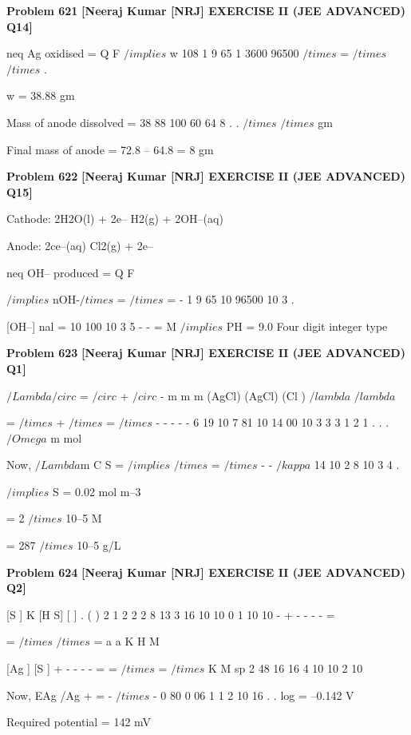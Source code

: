 \begin{problembox}
\textbf{Problem 621} \hfill \textbf{[Neeraj Kumar [NRJ] EXERCISE II (JEE ADVANCED) Q14]}
\label{q:ext-nrj_all_questions-621}

neq Ag oxidised = Q
F $/implies$ w
108
1
9 65 1 3600
96500
$/times$ =
$/times$ $/times$
.
 
   w = 38.88 gm
 
   Mass of anode dissolved = 38 88
100
60
64 8
.
.
$/times$
$/times$
gm
 
   Final mass of anode = 72.8 -- 64.8 = 8 gm
\end{problembox}

\begin{problembox}
\textbf{Problem 622} \hfill \textbf{[Neeraj Kumar [NRJ] EXERCISE II (JEE ADVANCED) Q15]}
\label{q:ext-nrj_all_questions-622}

Cathode: 2H2O(l) + 2e-- 
 H2(g) + 2OH--(aq)
 
 Anode: 2ce--(aq) 
 Cl2(g) + 2e--
 
 neq OH-- produced = Q
F 
 
 $/implies$ nOH-$/times$ =
$/times$
=
-
1
9 65 10
96500
10 3
.
 
   [OH--]  nal = 10
100
10
3
5
-
-
=
M $/implies$ PH = 9.0
Four digit integer type
\end{problembox}

\begin{problembox}
\textbf{Problem 623} \hfill \textbf{[Neeraj Kumar [NRJ] EXERCISE II (JEE ADVANCED) Q1]}
\label{q:ext-nrj_all_questions-623}

$/Lambda$$/circ$
=
$/circ$
+ $/circ$
-
m
m
m
(AgCl)
(AgCl)
(Cl )
$/lambda$
$/lambda$
 
 
                 
=
$/times$
+
$/times$
=
$/times$
-
-
-
-
-
6 19 10
7 81 10
14 00 10
3
3
3
1
2
1
.
.
.
$/Omega$ m mol
 
 
 Now, $/Lambda$m
C
S
=
$/implies$
$/times$
=
$/times$
-
-
$/kappa$
14 10
2 8 10
3
4
.
 
 
 $/implies$ S = 0.02 mol m--3 
 
         = 2 $/times$ 10--5 M
 
         = 287 $/times$ 10--5 g/L
\end{problembox}

\begin{problembox}
\textbf{Problem 624} \hfill \textbf{[Neeraj Kumar [NRJ] EXERCISE II (JEE ADVANCED) Q2]}
\label{q:ext-nrj_all_questions-624}

[S
]
K
[H S]
[
]
.
(
)
2
1
2
2
2
8
13
3
16
10
10
0 1
10
10
-
+
-
-
-
-
=
 
 
=
$/times$
$/times$
=
a
a
K
H
M
 
 
   [Ag ]
[S
]
+
-
-
-
-
=
=
$/times$
=
$/times$
K
M
sp
2
48
16
16
4
10
10
2
10
 
 
 Now, EAg /Ag
+
=
-
$/times$
-
0 80
0 06
1
1
2
10 16
.
.
log
 = --0.142 V
 
   Required potential = 142 mV
\end{problembox}

